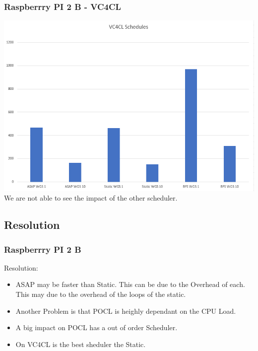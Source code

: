 \documentclass{beamer}
\begin{document}
\begin{frame}
	\frametitle{Raspberrry PI 2 B - VC4CL}
	\includegraphics[width=.8\textwidth]{res/ResultsVC4CL_WithoutSerial.PNG}\\
	We are not able to see the impact of the other scheduler.
\end{frame}
\subsection{Resolution}
\begin{frame}
	\frametitle{Raspberrry PI 2 B}
	Resolution:
	\begin{itemize}
		\item ASAP may be faster than Static. This can be due to the Overhead of each. This may due to the overhead of the loops of the static.
		\item Another Problem is that POCL is heighly dependant on the CPU Load.
		\item A big impact on POCL has a out of order Scheduler.
		\item On VC4CL is the best sheduler the Static.
	\end{itemize}
\end{frame}
\end{document}
